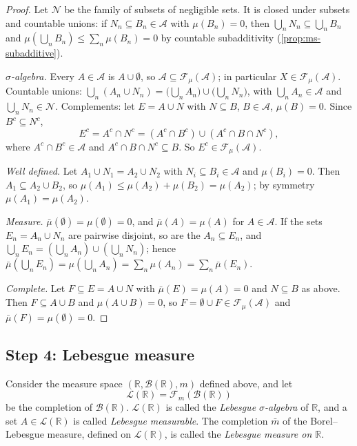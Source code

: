 \begin{proof}
Let $\mathcal N$ be the family of subsets of negligible sets. It is closed under subsets and
countable unions: if $N_n\subseteq B_n\in\mathcal A$ with $\mu(B_n)=0$, then
$\bigcup_nN_n\subseteq\bigcup_nB_n$ and $\mu(\bigcup_nB_n)\le\sum_n\mu(B_n)=0$ by countable
subadditivity (\cref{prop:ms-subadditive}).

\emph{$\sigma$-algebra.} Every $A\in\mathcal A$ is $A\cup\emptyset$, so
$\mathcal A\subseteq\mathcal F_\mu(\mathcal A)$; in particular $X\in\mathcal F_\mu(\mathcal A)$.
Countable unions: $\bigcup_n(A_n\cup N_n)=\big(\bigcup_nA_n\big)\cup\big(\bigcup_nN_n\big)$,
with $\bigcup_nA_n\in\mathcal A$ and $\bigcup_nN_n\in\mathcal N$. Complements: let
$E=A\cup N$ with $N\subseteq B$, $B\in\mathcal A$, $\mu(B)=0$. Since $B^c\subseteq N^c$,
\[
  E^c=A^c\cap N^c=(A^c\cap B^c)\cup(A^c\cap B\cap N^c),
\]
where $A^c\cap B^c\in\mathcal A$ and $A^c\cap B\cap N^c\subseteq B$. So
$E^c\in\mathcal F_\mu(\mathcal A)$.

\emph{Well defined.} Let $A_1\cup N_1=A_2\cup N_2$ with $N_i\subseteq B_i\in\mathcal A$ and
$\mu(B_i)=0$. Then $A_1\subseteq A_2\cup B_2$, so
$\mu(A_1)\le\mu(A_2)+\mu(B_2)=\mu(A_2)$; by symmetry $\mu(A_1)=\mu(A_2)$.

\emph{Measure.} $\bar\mu(\emptyset)=\mu(\emptyset)=0$, and $\bar\mu(A)=\mu(A)$ for
$A\in\mathcal A$. If the sets $E_n=A_n\cup N_n$ are pairwise disjoint, so are the
$A_n\subseteq E_n$, and $\bigcup_nE_n=(\bigcup_nA_n)\cup(\bigcup_nN_n)$; hence
$\bar\mu(\bigcup_nE_n)=\mu(\bigcup_nA_n)=\sum_n\mu(A_n)=\sum_n\bar\mu(E_n)$.

\emph{Complete.} Let $F\subseteq E=A\cup N$ with $\bar\mu(E)=\mu(A)=0$ and $N\subseteq B$ as
above. Then $F\subseteq A\cup B$ and $\mu(A\cup B)=0$, so $F=\emptyset\cup F\in\mathcal
F_\mu(\mathcal A)$ and $\bar\mu(F)=\mu(\emptyset)=0$.
\end{proof}

\subsection*{Step 4: Lebesgue measure}

\begin{definition}\label{def:mf-lebesgue-sigma}
Consider the measure space $(\mathbb R,\mathcal B(\mathbb R),m)$ defined above, and let
\[
  \mathcal L(\mathbb R)=\mathcal F_m(\mathcal B(\mathbb R))
\]
be the completion of $\mathcal B(\mathbb R)$. $\mathcal L(\mathbb R)$ is called the
\emph{Lebesgue $\sigma$-algebra} of $\mathbb R$, and a set $A\in\mathcal L(\mathbb R)$ is called
\emph{Lebesgue measurable}. The completion $\bar m$ of the Borel--Lebesgue measure, defined
on $\mathcal L(\mathbb R)$, is called the \emph{Lebesgue measure on $\mathbb R$}.
\end{definition}


